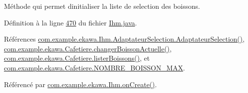 Méthode qui permet d\textquotesingle{}initialiser la liste de selection des boissons. 



Définition à la ligne \hyperlink{_ihm_8java_source_l00470}{470} du fichier \hyperlink{_ihm_8java_source}{Ihm.\+java}.



Références \hyperlink{_ihm_8java_source_l00156}{com.\+example.\+ekawa.\+Ihm.\+Adaptateur\+Selection.\+Adaptateur\+Selection()}, \hyperlink{_cafetiere_8java_source_l00224}{com.\+example.\+ekawa.\+Cafetiere.\+changer\+Boisson\+Actuelle()}, \hyperlink{_cafetiere_8java_source_l00193}{com.\+example.\+ekawa.\+Cafetiere.\+lister\+Boissons()}, et \hyperlink{_cafetiere_8java_source_l00030}{com.\+example.\+ekawa.\+Cafetiere.\+N\+O\+M\+B\+R\+E\+\_\+\+B\+O\+I\+S\+S\+O\+N\+\_\+\+M\+AX}.



Référencé par \hyperlink{_ihm_8java_source_l00248}{com.\+example.\+ekawa.\+Ihm.\+on\+Create()}.


